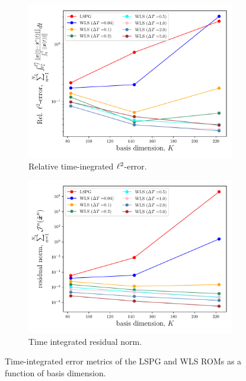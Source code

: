 \begin{figure}
\begin{center}
\begin{subfigure}[t]{0.49\textwidth}
\includegraphics[trim={0cm 0cm 0cm 0cm},clip,width=1.0\linewidth]{figs/swe/swe_converge_error.pdf}
\caption{Relative time-inegrated $\ell^2$-error.}
\end{subfigure}
\begin{subfigure}[t]{0.49\textwidth}
\includegraphics[trim={0cm 0cm 0cm 0cm},clip,width=1.0\linewidth]{figs/swe/swe_converge_resid.pdf}
\caption{Time integrated residual norm.}
\end{subfigure}
\caption{Time-integrated error metrics of the LSPG and WLS ROMs as a function of basis dimension.} 
\label{fig:rom_swe_converge}
\end{center}
\end{figure}

